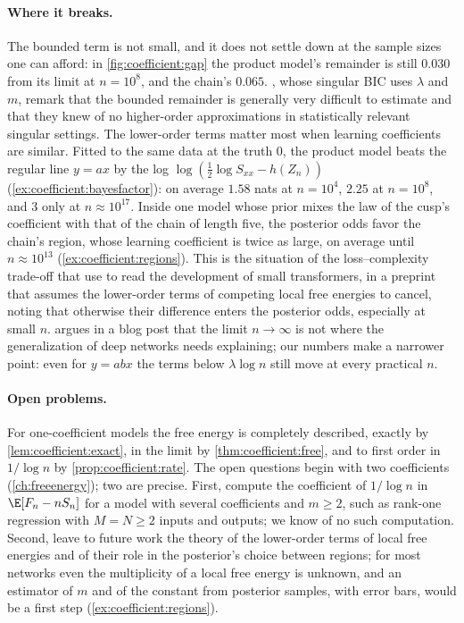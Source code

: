 \begin{refsection}
\paragraph{Where it breaks.} The bounded term is not small, and it does not settle down at the sample sizes one can afford: in \cref{fig:coefficient:gap} the product model's remainder is still $0.030$ from its limit at $n=10^8$, and the chain's $0.065$. \Textcite{DrtonPlummer2017}, whose singular BIC uses $\lambda$ and $m$, remark that the bounded remainder is generally very difficult to estimate and that they knew of no higher-order approximations in statistically relevant singular settings. The lower-order terms matter most when learning coefficients are similar. Fitted to the same data at the truth $0$, the product model beats the regular line $y=ax$ by the log  $\log(\frac12\log S_{xx}-h(Z_n))$ (\cref{ex:coefficient:bayesfactor}): on average $1.58$ nats at $n=10^4$, $2.25$ at $n=10^8$, and $3$ only at $n\approx10^{17}$. Inside one model whose prior mixes the law of the cusp's coefficient with that of the chain of length five, the posterior odds favor the chain's region, whose learning coefficient is twice as large, on average until $n\approx10^{13}$ (\cref{ex:coefficient:regions}). This is the situation of the loss--complexity trade-off that \textcite{CarrollEtAl2025} use to read the development of small transformers, in a preprint that assumes the lower-order terms of competing local free energies to cancel, noting that otherwise their difference enters the posterior odds, especially at small $n$. \Textcite{Skalse2023} argues in a blog post that the limit $n\to\infty$ is not where the generalization of deep networks needs explaining; our numbers make a narrower point: even for $y=abx$ the terms below $\lambda\log n$ still move at every practical $n$.

\paragraph{Open problems.} For one-coefficient models the free energy is completely described, exactly by \cref{lem:coefficient:exact}, in the limit by \cref{thm:coefficient:free}, and to first order in $1/\log n$ by \cref{prop:coefficient:rate}. The open questions begin with two coefficients (\cref{ch:freeenergy}); two are precise. First, compute the coefficient of $1/\log n$ in $\E[F_n-nS_n]$ for a model with several coefficients and $m\ge2$, such as rank-one regression with $M=N\ge2$ inputs and outputs; we know of no such computation. Second, \textcite{CarrollEtAl2025} leave to future work the theory of the lower-order terms of local free energies and of their role in the posterior's choice between regions; for most networks even the multiplicity of a local free energy is unknown, and an estimator of $m$ and of the constant from posterior samples, with error bars, would be a first step (\cref{ex:coefficient:regions}).


\end{refsection}
